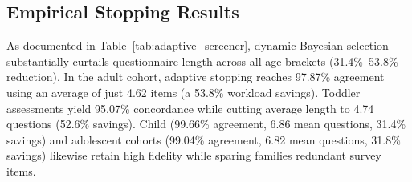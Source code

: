 \documentclass[conference]{IEEEtran}
\begin{document}
\begin{table}[t]
\centering
\caption{Adaptive Bayesian Information-Gain Stopping ($\delta=0.05$, Target $95\%$ Certainty)}
\label{tab:adaptive_screener}
\footnotesize
\setlength{\tabcolsep}{3pt}
\vspace{-2mm}
\end{table}

\subsection{Empirical Stopping Results}
As documented in Table~\ref{tab:adaptive_screener}, dynamic Bayesian selection substantially curtails questionnaire length across all age brackets (31.4\%--53.8\% reduction). In the adult cohort, adaptive stopping reaches 97.87\% agreement using an average of just 4.62 items (a 53.8\% workload savings). Toddler assessments yield 95.07\% concordance while cutting average length to 4.74 questions (52.6\% savings). Child (99.66\% agreement, 6.86 mean questions, 31.4\% savings) and adolescent cohorts (99.04\% agreement, 6.82 mean questions, 31.8\% savings) likewise retain high fidelity while sparing families redundant survey items.
\end{document}
